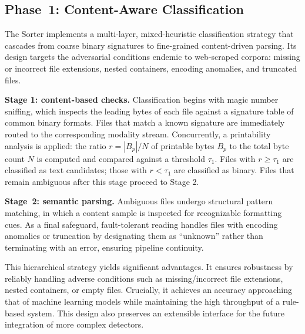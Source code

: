 \documentclass[sigconf, nonacm]{acmart}
\begin{document}
\subsection{Phase~1: Content-Aware Classification}

The Sorter implements a multi-layer, mixed-heuristic classification strategy that cascades from coarse binary signatures to fine-grained content-driven parsing. Its design targets the adversarial conditions endemic to web-scraped corpora: missing or incorrect file extensions, nested containers, encoding anomalies, and truncated files.

\textbf{Stage 1: content-based checks.}
Classification begins with magic number sniffing, which inspects the leading bytes of each file against a signature table of common binary formats. Files that match a known signature are immediately routed to the corresponding modality stream. Concurrently, a printability analysis is applied: the ratio $r = |B_p| / N$ of printable bytes $B_p$ to the total byte count $N$ is computed and compared against a threshold $\tau_1$. Files with $r \geq \tau_1$ are classified as text candidates; those with $r < \tau_1$ are classified as binary. Files that remain ambiguous after this stage proceed to Stage 2.

\textbf{Stage~2: semantic parsing.}
Ambiguous files undergo structural pattern matching, in which a content sample is inspected for recognizable formatting cues. As a final safeguard, fault-tolerant reading handles files with encoding anomalies or truncation by designating them as ``unknown'' rather than terminating with an error, ensuring pipeline continuity. 

This hierarchical strategy yields significant advantages. It ensures robustness by reliably handling adverse conditions such as missing/incorrect file extensions, nested containers, or empty files. Crucially, it achieves an accuracy approaching that of machine learning models while maintaining the high throughput of a rule-based system. This design also preserves an extensible interface for the future integration of more complex detectors.
\end{document}
